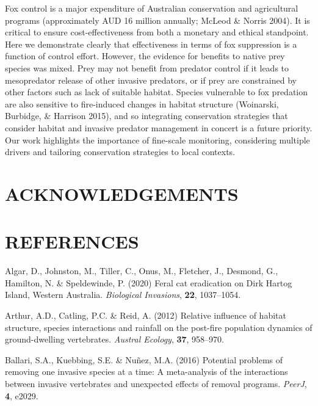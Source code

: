 \documentclass[]{elsarticle} %
\begin{document}
Fox control is a major expenditure of Australian conservation and agricultural programs (approximately AUD 16 million annually; McLeod \& Norris 2004). It is critical to ensure cost-effectiveness from both a monetary and ethical standpoint. Here we demonstrate clearly that effectiveness in terms of fox suppression is a function of control effort. However, the evidence for benefits to native prey species was mixed. Prey may not benefit from predator control if it leads to mesopredator release of other invasive predators, or if prey are constrained by other factors such as lack of suitable habitat. Species vulnerable to fox predation are also sensitive to fire-induced changes in habitat structure (Woinarski, Burbidge, \& Harrison 2015), and so integrating conservation strategies that consider habitat and invasive predator management in concert is a future priority. Our work highlights the importance of fine-scale monitoring, considering multiple drivers and tailoring conservation strategies to local contexts.

\newpage

\hypertarget{acknowledgements}{%
\section*{ACKNOWLEDGEMENTS}\label{acknowledgements}}

\newpage

\hypertarget{references}{%
\section*{REFERENCES}\label{references}}

\hypertarget{refs}{}
\leavevmode\hypertarget{ref-algar2020feral}{}%
Algar, D., Johnston, M., Tiller, C., Onus, M., Fletcher, J., Desmond, G., Hamilton, N. \& Speldewinde, P. (2020) Feral cat eradication on Dirk Hartog Island, Western Australia. \emph{Biological Invasions}, \textbf{22}, 1037--1054.

\leavevmode\hypertarget{ref-arthur2012relative}{}%
Arthur, A.D., Catling, P.C. \& Reid, A. (2012) Relative influence of habitat structure, species interactions and rainfall on the post-fire population dynamics of ground-dwelling vertebrates. \emph{Austral Ecology}, \textbf{37}, 958--970.

\leavevmode\hypertarget{ref-ballari2016potential}{}%
Ballari, S.A., Kuebbing, S.E. \& Nuñez, M.A. (2016) Potential problems of removing one invasive species at a time: A meta-analysis of the interactions between invasive vertebrates and unexpected effects of removal programs. \emph{PeerJ}, \textbf{4}, e2029.
\end{document}
